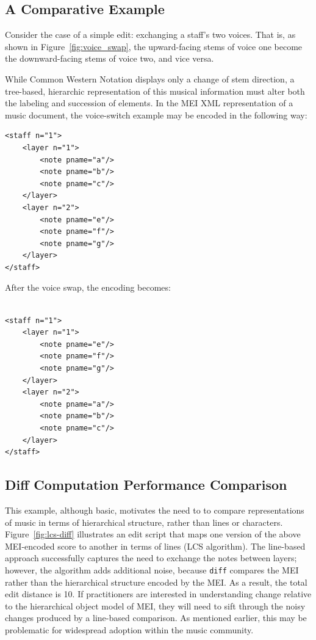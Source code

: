 \documentclass{article}
\newcommand{\code}[1]{\texttt{#1}}
\begin{document}
\subsection{A Comparative Example}
Consider the case of a simple edit: exchanging a staff's two voices.
That is, as shown in Figure~\ref{fig:voice_swap}, the upward-facing
stems of voice one become the downward-facing stems of voice two, and
vice versa.

While Common Western Notation displays only a change of stem
direction, a tree-based, hierarchic representation of this musical
information must alter both the labeling and succession of elements.
In the MEI XML representation of a music document, the voice-switch
example may be encoded in the following way:


\begin{verbatim}
<staff n="1"> 
    <layer n="1">
        <note pname="a"/>
        <note pname="b"/>
        <note pname="c"/>
    </layer>
    <layer n="2">
        <note pname="e"/>
        <note pname="f"/>
        <note pname="g"/>
    </layer>
</staff>
\end{verbatim}

After the voice swap, the encoding becomes:

\begin{verbatim}

<staff n="1">
    <layer n="1">
        <note pname="e"/>
        <note pname="f"/>
        <note pname="g"/>
    </layer>
    <layer n="2">
        <note pname="a"/>
        <note pname="b"/>
        <note pname="c"/>
    </layer>
</staff>
\end{verbatim}


\subsection{Diff Computation Performance Comparison}
This example, although basic, motivates the need to to compare representations of music in terms of 
hierarchical structure, rather than lines or characters. Figure~\ref{fig:lcs-diff} illustrates an edit script that maps one
version of the above MEI-encoded score to another in terms of lines (LCS algorithm).
The line-based approach successfully captures the need to exchange the
notes between layers; however, the algorithm adds additional noise,
because \code{diff} compares the MEI rather than the hierarchical
structure encoded by the MEI.  As a result, the total edit distance is
10.  If practitioners are interested in understanding change relative
to the hierarchical object model of MEI, they will need to sift
through the noisy changes produced by a line-based comparison.  As
mentioned earlier, this may be problematic for widespread adoption
within the music community.
\end{document}
